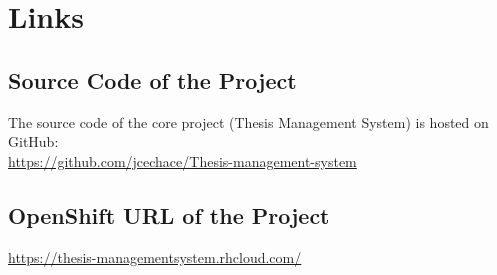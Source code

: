 \documentclass[11pt,oneside]{fithesis2}
\begin{document}
\chapter{Links}

\section{Source Code of the Project}
The source code of the core project (Thesis Management System) is hosted on GitHub:\\
\url{https://github.com/jcechace/Thesis-management-system}

\section{OpenShift URL of the Project}
\url{https://thesis-managementsystem.rhcloud.com/}
\end{document}
